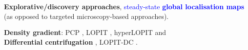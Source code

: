 \documentclass{beamer}
\theoremstyle{example}
\begin{document}
\begin{frame}{}

  \begin{columns}
    \begin{column}{0.5\textwidth}

      \textbf{Explorative/discovery approaches},
      \textcolor{Blue}{steady-state \textbf{global localisation maps}}
      (as opposed to targeted microscopy-based approaches).

      \bigskip

      \small{

        \textbf{Density gradient}: PCP \citep{Dunkley:2006}, LOPIT
        \citep{Foster2006}, hyperLOPIT
        \citep{Christoforou:2016,Mulvey:2017} and \\

        \textbf{Differential centrifugation} \cite{Itzhak:2016},
        LOPIT-DC \citep{Geladaki:2019}.

      }

      \bigskip



\end{column}
\end{columns}
\end{frame}
\end{document}

